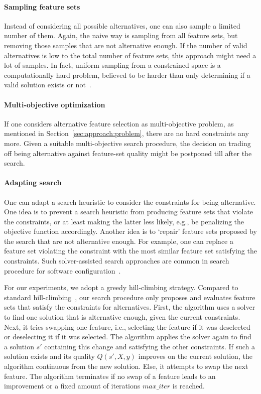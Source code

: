 \documentclass{article}
\theoremstyle{definition}
\begin{document}
\paragraph{Sampling feature sets}

Instead of considering all possible alternatives, one can also sample a limited number of them.
Again, the naive way is sampling from all feature sets, but removing those samples that are not alternative enough.
If the number of valid alternatives is low to the total number of feature sets, this approach might need a lot of samples.
In fact, uniform sampling from a constrained space is a computationally hard problem, believed to be harder than only determining if a valid solution exists or not~\cite{ermon2012uniform}.

\paragraph{Multi-objective optimization}

If one considers alternative feature selection as multi-objective problem, as mentioned in Section~\ref{sec:approach:problem}, there are no hard constraints any more.
Given a suitable multi-objective search procedure, the decision on trading off being alternative against feature-set quality might be postponed till after the search.

\paragraph{Adapting search}

One can adapt a search heuristic to consider the constraints for being alternative.
One idea is to prevent a search heuristic from producing feature sets that violate the constraints, or at least making the latter less likely, e.g., be penalizing the objective function accordingly.
Another idea is to `repair' feature sets proposed by the search that are not alternative enough.
For example, one can replace a feature set violating the constraint with the most similar feature set satisfying the constraints.
Such solver-assisted search approaches are common in search procedure for software configuration~\cite{white2010automated,henard2015combining,guo2018preserve}.

For our experiments, we adopt a greedy hill-climbing strategy.
Compared to standard hill-climbing~\cite{kohavi1997wrappers}, our search procedure only proposes and evaluates feature sets that satisfy the constraints for alternatives.
First, the algorithm uses a solver to find one solution that is alternative enough, given the current constraints.
Next, it tries swapping one feature, i.e., selecting the feature if it was deselected or deselecting it if it was selected.
The algorithm applies the solver again to find a solution $s'$ containing this change and satisfying the other constraints.
If such a solution exists and its quality $Q(s',X,y)$ improves on the current solution, the algorithm continuous from the new solution.
Else, it attempts to swap the next feature.
The algorithm terminates if no swap of a feature leads to an improvement or a fixed amount of iterations $max\_iter$ is reached.
\end{document}
